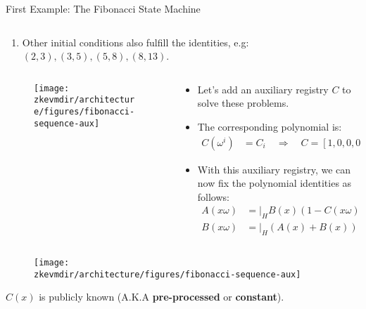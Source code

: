 \begin{frame}[allowframebreaks]{First Example: The Fibonacci State Machine}
\begin{columns}
\begin{column}{0.7\textwidth}
\begin{itemize}
\begin{enumerate}
The equations are not cyclic.
\item Other initial conditions also fulfill the identities, e.g:
$(2,3),(3,5),(5,8),(8,13)$.
\end{enumerate}
\end{itemize}
\end{column}
\end{columns}



\begin{columns}
\begin{column}{0.4\textwidth}
\begin{figure}
	\texttt{[image: \\zkevmdir/architecture/figures/fibonacci-sequence-aux]}
\end{figure}
\end{column}
\begin{column}{0.6\textwidth}
\begin{itemize}
\item Let's add an auxiliary registry $C$ to solve these problems.
\item The corresponding polynomial is:
\begin{align*}
C(\omega^i) &= C_i \quad \Longrightarrow \quad C = [1, 0, 0, 0].
\end{align*}
\item With this auxiliary registry, we can now fix the polynomial identities as follows:
\begin{align*}
A(x\omega) &= \bigg\lvert_H  B(x)(1 - C(x\omega)), \\
B(x\omega) &= \bigg\lvert_H (A(x) + B(x))(1 - C(x\omega)) + C(x\omega).
\end{align*}
\end{itemize}
\end{column}
\end{columns}


\begin{columns}
\begin{column}{0.4\textwidth}
\begin{figure}
\texttt{[image: \\zkevmdir/architecture/figures/fibonacci-sequence-aux]}
\end{figure}
$C(x)$ is publicly known (A.K.A \textbf{pre-processed} or \textbf{constant}).
\end{column}


\end{columns}
\end{frame}
